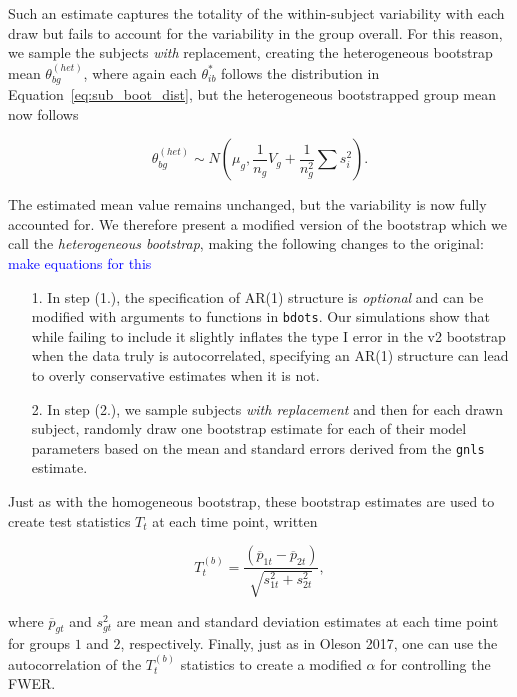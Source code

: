 \documentclass{article}
\newcommand{\xt}{\texttt}
\providecommand{\cn}[1]{\textcolor{blue}{#1}}
\begin{document}
Such an estimate captures the totality of the within-subject variability with each draw but fails to account for the variability in the group overall. For this reason, we sample the subjects \textit{with} replacement, creating the heterogeneous bootstrap mean $\theta_{bg}^{(het)}$, where again each $\theta_{ib}^*$ follows the distribution in Equation~\ref{eq:sub_boot_dist}, but the heterogeneous bootstrapped group mean now follows

\begin{equation}\label{eq:w_rep_boot}
\theta_{bg}^{(het)} \sim N \left( \mu_{g}, \frac{1}{n_g} V_{g} + \frac{1}{n_g^2} \sum s_i^2 \right).
\end{equation}

The estimated mean value remains unchanged, but the variability is now fully accounted for. We therefore present a modified version of the bootstrap which we call the \textit{heterogeneous bootstrap}, making the following changes to the original: \cn{make equations for this}

\begin{enumerate}
\item[1.] In step (1.), the specification of AR(1) structure is \textit{optional} and can be modified with arguments to functions in \xt{bdots}. Our simulations show that while failing to include it slightly inflates the type I error in the v2 bootstrap when the data truly is autocorrelated, specifying an AR(1) structure can lead to overly conservative estimates when it is not.
\item[2.] In step (2.), we sample subjects \textit{with replacement} and then for each drawn subject, randomly draw one bootstrap estimate for each of their model parameters based on the mean and standard errors derived from the \xt{gnls} estimate.
\end{enumerate}

Just as with the homogeneous bootstrap, these bootstrap estimates are used to create test statistics $T_t$ at each time point, written

\begin{equation}
T_t^{(b)} = \frac{(\overline{p}_{1t} - \overline{p}_{2t})}{\sqrt{s_{1t}^2 + s_{2t}^2}},
\end{equation}

where $\overline{p}_{gt}$ and $s_{gt}^2$ are mean and standard deviation estimates at each time point for groups $1$ and $2$, respectively. Finally, just as in Oleson 2017, one can use the autocorrelation of the $T_t^{(b)}$ statistics to create a modified $\alpha$ for controlling the FWER.
\end{document}
